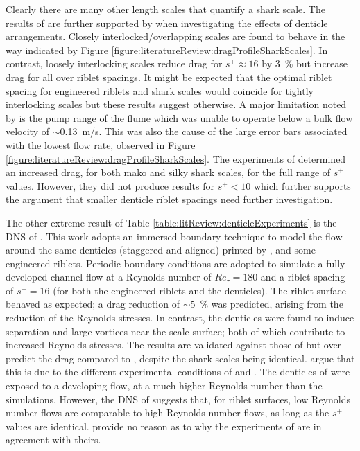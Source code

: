 \documentclass[12pt,oneside,a4paper]{article}
\begin{document}
%
Clearly there are many other length scales that quantify a shark scale. The results of \cite{wen2014} are further supported by \cite{wen2015} when investigating the effects of denticle arrangements. Closely interlocked/overlapping scales are found to behave in the way indicated by Figure \ref{figure:literatureReview:dragProfileSharkScales}. In contrast, loosely interlocking scales reduce drag for $s^+ \approx 16$ by \SI{3}{\%} but increase drag for all over riblet spacings. It might be expected that the optimal riblet spacing for engineered riblets and shark scales would coincide for tightly interlocking scales but these results suggest otherwise. A major limitation noted by \cite{wen2014} is the pump range of the flume which was unable to operate below a bulk flow velocity of $\sim$\SI{0.13}{m/s}. This was also the cause of the large error bars associated with the lowest flow rate, observed in Figure \ref{figure:literatureReview:dragProfileSharkScales}. The experiments of \cite{bechert1985} determined an increased drag, for both mako and silky shark scales, for the full range of $s^+$ values. However, they did not produce results for $s^+<10$ which further supports the argument that smaller denticle riblet spacings need further investigation.

The other extreme result of Table \ref{table:litReview:denticleExperiments} is the DNS of \cite{boomsma2015}. This work adopts an immersed boundary technique to model the flow around the same denticles (staggered and aligned) printed by \cite{wen2014,wen2015}, and some engineered riblets. Periodic boundary conditions are adopted to simulate a fully developed channel flow at a Reynolds number of $Re_\tau = 180$ and a riblet spacing of $s^+=16$ (for both the engineered riblets and the denticles). The riblet surface behaved as expected; a drag reduction of $\sim$\SI{5}{\%} was predicted, arising from the reduction of the Reynolds stresses. In contrast, the denticles were found to induce separation and large vortices near the scale surface; both of which contribute to increased Reynolds stresses. The results are validated against those of \cite{bechert1985} but over predict the drag compared to \cite{wen2014,wen2015}, despite the shark scales being identical. \cite{boomsma2016} argue that this is due to the different experimental conditions of \cite{wen2014} and \cite{bechert1985}. The denticles of \cite{wen2014} were exposed to a developing flow, at a much higher Reynolds number than the simulations. However, the DNS of \cite{garcia2012} suggests that, for riblet surfaces, low Reynolds number flows are comparable to high Reynolds number flows, as long as the $s^+$ values are identical. \cite{boomsma2016} provide no reason as to why the experiments of \cite{bechert1985} are in agreement with theirs. 
\end{document}
